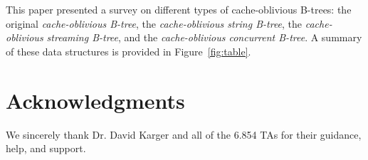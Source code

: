 \documentclass[preprint]{style}
\begin{document}
This paper presented a survey on different types of cache-oblivious B-trees: the 
original \textit{cache-oblivious B-tree}, the \textit{cache-oblivious string
B-tree}, the \textit{cache-oblivious streaming B-tree}, and the \textit{cache-oblivious
concurrent B-tree}. A summary of these data structures is provided
in Figure~\ref{fig:table}.


\section{Acknowledgments}

We sincerely thank Dr. David Karger and all of the 6.854 TAs
for their guidance, help, and support.



%



\end{document}
